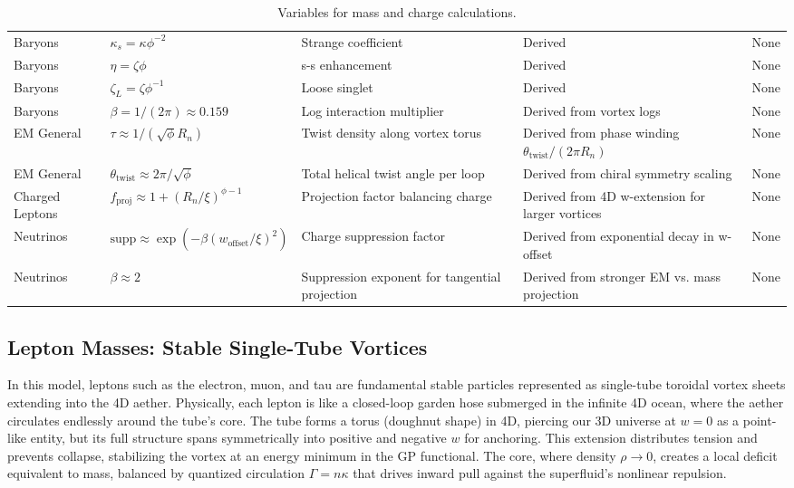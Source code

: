 \documentclass{article}
\begin{document}
\begin{sidewaystable}[p]
\begin{tabular}{|p{2cm}|p{3cm}|p{6cm}|p{6cm}|p{3cm}|}
Baryons & $\kappa_s = \kappa \phi^{-2}$ & Strange coefficient & Derived & None \\
Baryons & $\eta = \zeta \phi$ & s-s enhancement & Derived & None \\
Baryons & $\zeta_L = \zeta \phi^{-1}$ & Loose singlet & Derived & None \\
Baryons & $\beta = 1/(2\pi) \approx 0.159$ & Log interaction multiplier & Derived from vortex logs & None \\
EM General & $\tau \approx 1 / (\sqrt{\phi} R_n)$ & Twist density along vortex torus & Derived from phase winding $\theta_{\text{twist}} / (2\pi R_n)$ & None \\
EM General & $\theta_{\text{twist}} \approx 2\pi / \sqrt{\phi}$ & Total helical twist angle per loop & Derived from chiral symmetry scaling & None \\
Charged Leptons & $f_{\text{proj}} \approx 1 + (R_n / \xi)^{\phi - 1}$ & Projection factor balancing charge & Derived from 4D w-extension for larger vortices & None \\
Neutrinos & $\text{supp} \approx \exp( - \beta (w_{\text{offset}} / \xi)^2 )$ & Charge suppression factor & Derived from exponential decay in w-offset & None \\
Neutrinos & $\beta \approx 2$ & Suppression exponent for tangential projection & Derived from stronger EM vs. mass projection & None \\
\hline
\end{tabular}
\caption{Variables for mass and charge calculations.}
\label{tab:variables}
\end{sidewaystable}

\subsection{Lepton Masses: Stable Single-Tube Vortices}

In this model, leptons such as the electron, muon, and tau are fundamental stable particles represented as single-tube toroidal vortex sheets extending into the 4D aether. Physically, each lepton is like a closed-loop garden hose submerged in the infinite 4D ocean, where the aether circulates endlessly around the tube's core. The tube forms a torus (doughnut shape) in 4D, piercing our 3D universe at $w=0$ as a point-like entity, but its full structure spans symmetrically into positive and negative $w$ for anchoring. This extension distributes tension and prevents collapse, stabilizing the vortex at an energy minimum in the GP functional. The core, where density $\rho \to 0$, creates a local deficit equivalent to mass, balanced by quantized circulation $\Gamma = n \kappa$ that drives inward pull against the superfluid's nonlinear repulsion.
\end{document}
